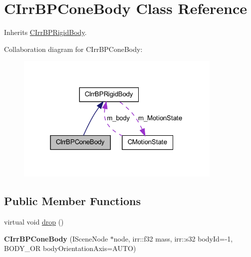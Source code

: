 \hypertarget{class_c_irr_b_p_cone_body}{
\section{CIrrBPConeBody Class Reference}
\label{class_c_irr_b_p_cone_body}
}


Inherits \hyperlink{class_c_irr_b_p_rigid_body}{CIrrBPRigidBody}.



Collaboration diagram for CIrrBPConeBody:\nopagebreak
\begin{figure}[H]
\begin{center}
\leavevmode
\includegraphics[width=279pt]{class_c_irr_b_p_cone_body__coll__graph}
\end{center}
\end{figure}
\subsection*{Public Member Functions}
\begin{DoxyCompactItemize}
\item 
virtual void \hyperlink{class_c_irr_b_p_cone_body_a47470fa549f852a5d315f0decb4d195a}{drop} ()
\item 
\hypertarget{class_c_irr_b_p_cone_body_acda43501a8f1826103caf9a925ba229c}{
{\bfseries CIrrBPConeBody} (ISceneNode $\ast$node, irr::f32 mass, irr::s32 bodyId=-\/1, BODY\_\-OR bodyOrientationAxis=AUTO)}
\label{class_c_irr_b_p_cone_body_acda43501a8f1826103caf9a925ba229c}

\end{DoxyCompactItemize}


